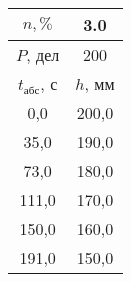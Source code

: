 \begin{tabular}[t]{|c|c|}
\hline
$n, \%$ & 3.0 \\
\hline
$P$, дел & 200 \\
\hline
$t_{абс}$, с & $h$, мм \\ 
\hline
0,0 & 200,0 \\ 
35,0 & 190,0 \\ 
73,0 & 180,0 \\ 
111,0 & 170,0 \\ 
150,0 & 160,0 \\ 
191,0 & 150,0 \\ 
\hline
\end{tabular}
